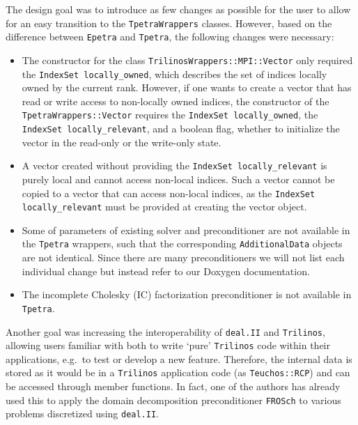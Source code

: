 \documentclass{ansarticle-preprint}
\newcommand{\specialword}[1]{\texttt{#1}}
\newcommand{\dealii}{{\specialword{deal.II}}\xspace}
\newcommand{\trilinos}{{\specialword{Trilinos}}\xspace}
\newcommand{\epetra}{{\specialword{Epetra}}\xspace}
\newcommand{\tpetra}{{\specialword{Tpetra}}\xspace}
\begin{document}
The design goal was to introduce as few changes as possible for the user to allow for an easy transition to the
\texttt{TpetraWrappers} classes.
However, based on the difference between \epetra{} and \tpetra{}, the following changes were necessary:
\begin{itemize}
  \item The constructor for the class \texttt{TrilinosWrappers::MPI::Vector} only required the \texttt{IndexSet locally\_owned},
    which describes the set of indices locally owned by the current rank.
    However, if one wants to create a vector that has read or write access to non-locally owned indices,  the constructor of the
    \texttt{TpetraWrappers::Vector} requires the \texttt{IndexSet locally\_owned}, the \texttt{IndexSet locally\_relevant}, and
    a boolean flag, whether to initialize the vector in the read-only or the write-only state.
  \item A vector created without providing the \texttt{IndexSet locally\_relevant} is purely local and cannot access non-local indices.
    Such a vector cannot be copied to a vector that can access non-local indices, as the \texttt{IndexSet locally\_relevant} must
    be provided at creating the vector object. 
  \item Some of parameters of existing solver and preconditioner are
    not available in the \tpetra{} wrappers,
    such that the corresponding \texttt{AdditionalData} objects are not identical. 
    Since there are many preconditioners we will not list each individual change but instead refer 
    to our Doxygen documentation. 
  \item The incomplete Cholesky (IC) factorization preconditioner is not available 
   in \tpetra{}.
\end{itemize}

Another goal was increasing the interoperability of \dealii{} and \trilinos{},
allowing users familiar with both to write `pure' \trilinos{} code within their 
applications, e.g.\ to test or develop a new feature.
Therefore, the internal data is stored as it would be in a \trilinos{} 
application code (as \texttt{Teuchos::RCP}) and can be accessed through member functions. 
In fact, one of the authors has already used this to apply the domain decomposition preconditioner
\texttt{FROSch} to various problems discretized using \dealii{}.
\end{document}
